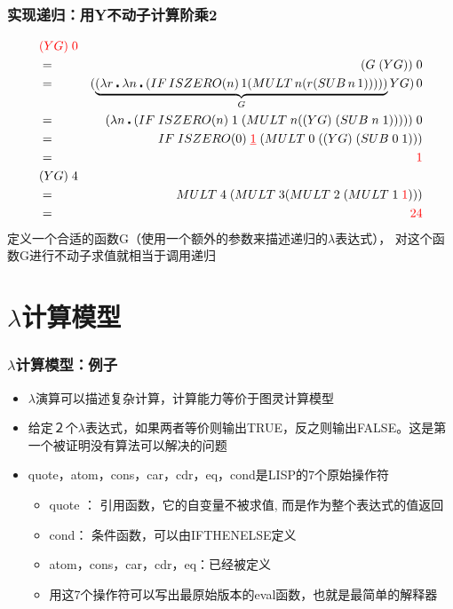 \documentclass[CJKutf8,compress,hyperref]{beamer}
\begin{document}
\begin{CJK}{UTF8}{song}
\begin{frame}
  \frametitle{实现递归：用Y不动子计算阶乘2} 
  \begin{eqnarray*} 
    & {\color{red}(YG) \; 0} &    \\
    & =  & (G \; (YG)) \; 0 \\  
    & = & (\underbrace{(\lambda r \centerdot \lambda n \centerdot  (IF \, ISZERO(n) \, 1 (MULT \, n (r (SUB \, n \,1)))))}_G YG) \, 0 \\
    & =  & (\lambda n \centerdot (IF \; ISZERO(n) \; 1 \; (MULT \; n ((YG) \; (SUB \; n \; 1))))) \;0 \\
    & = & IF \; ISZERO(0) \; {\color{red}\underline{1}} \; (MULT \; 0 \; ((YG) \; (SUB \;0 \;1))) \\ 
    & =  & {\color{red}1} \\
    & (YG) \; 4 &  \\ 
    & = &  MULT \; 4 \; (MULT \; 3 (MULT \; 2 \; (MULT \; 1 \; {\color{red}1}))) \\ 
    & =  & {\color{red}24}
  \end{eqnarray*} 
  {\color{red}定义一个合适的函数G（使用一个额外的参数来描述递归的$\lambda$表达式）， 对这个函数G进行不动子求值就相当于调用递归}
\end{frame}

\section{$\lambda$计算模型}

\begin{frame}
  \frametitle{$\lambda$计算模型：例子} 
  \begin{itemize}
  \item $\lambda$演算可以描述复杂计算，计算能力等价于图灵计算模型 
  \item 给定２个$\lambda$表达式，如果两者等价则输出TRUE，反之则输出FALSE。这是第一个被证明{\color{red}没有算法可以解决}的问题
  \item quote，atom，cons，car，cdr，eq，cond是LISP的7个原始操作符 
    \begin{itemize}
    \item quote ： 引用函数，它的自变量不被求值, 而是作为整个表达式的值返回
    \item cond： 条件函数，可以由IFTHENELSE定义
    \item atom，cons，car，cdr，eq：已经被定义
    \item 用这7个操作符可以写出最原始版本的eval函数，也就是最简单的{\color{red}解释器}\cite{RootsOfLisp}
    \end{itemize}
  \end{itemize}
\end{frame} 


\end{CJK}
\end{document}
